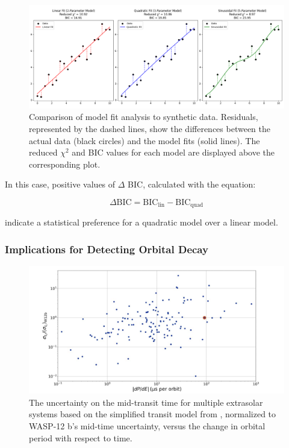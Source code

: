 \documentclass[oneside,12pt]{amsart}
\numberwithin{page}{section}
\begin{document}
\begin{figure}[htbp]
    \centering
    \includegraphics[width=\linewidth]{figs/reduced_chi_squared.png}
    \caption{Comparison of model fit analysis to synthetic data. Residuals, represented by the dashed lines, show the differences between the actual data (black circles) and the model fits (solid lines). The reduced $\chi^2$ and BIC values for each model are displayed above the corresponding plot.}
    \label{fig:reduced-chi-squared}
\end{figure}

In this case, positive values of $\Delta$ BIC, calculated with the equation:

\begin{equation}
    \Delta \text{BIC} = \text{BIC}_{\text{lin}} - \text{BIC}_{\text{quad}}
\end{equation}

indicate a statistical preference for a quadratic model over a linear model.

\subsubsection{Implications for Detecting Orbital Decay}

\begin{figure}[htbp]
    \centering
    \includegraphics[width=\linewidth]{figs/jackson_fig1.png}
    \caption{The uncertainty on the mid-transit time for multiple extrasolar systems based on the simplified transit model from \citet{carter2008analytic}, normalized to WASP-12 b's mid-time uncertainty, versus the change in orbital period with respect to time.}
    \label{fig:jackson-fig1}
\end{figure}
\end{document}
